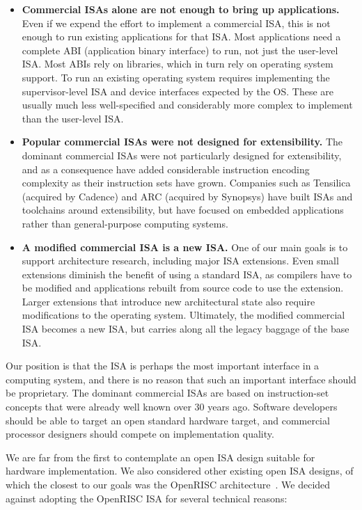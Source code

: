 \begin{itemize}
\item {\bf Commercial ISAs alone are not enough to bring up
  applications.}  Even if we expend the effort to implement a
  commercial ISA, this is not enough to run existing applications for
  that ISA.  Most applications need a complete ABI (application binary
  interface) to run, not just the user-level ISA.  Most ABIs rely on
  libraries, which in turn rely on operating system support.  To run an
  existing operating system requires implementing the supervisor-level
  ISA and device interfaces expected by the OS.  These are usually
  much less well-specified and considerably more complex to
  implement than the user-level ISA.

\item {\bf Popular commercial ISAs were not designed for extensibility.}  The
  dominant commercial ISAs were not particularly designed for
  extensibility, and as a consequence have added considerable
  instruction encoding complexity as their instruction sets have
  grown.  Companies such as Tensilica (acquired by Cadence) and ARC
  (acquired by Synopsys) have built ISAs and toolchains around
  extensibility, but have focused on embedded applications rather than
  general-purpose computing systems.

\item {\bf A modified commercial ISA is a new ISA.} One of our main
  goals is to support architecture research, including major ISA
  extensions.  Even small extensions diminish the benefit of using a
  standard ISA, as compilers have to be modified and applications
  rebuilt from source code to use the extension.  Larger extensions
  that introduce new architectural state also require modifications to
  the operating system.  Ultimately, the modified commercial ISA
  becomes a new ISA, but carries along all the legacy baggage of the
  base ISA.
\end{itemize}

Our position is that the ISA is perhaps the most important interface
in a computing system, and there is no reason that such an important
interface should be proprietary.  The dominant commercial ISAs are
based on instruction-set concepts that were already well known over 30
years ago.  Software developers should be able to target an open
standard hardware target, and commercial processor designers should
compete on implementation quality.

We are far from the first to contemplate an open ISA design suitable
for hardware implementation.  We also considered other existing open
ISA designs, of which the closest to our goals was the OpenRISC
architecture~\cite{openriscarch}.  We decided against adopting the
OpenRISC ISA for several technical reasons:

